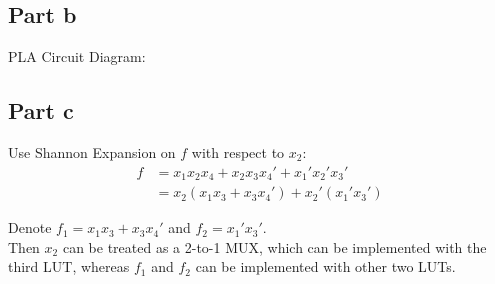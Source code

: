 \documentclass[12pt, a4paper]{article}
\begin{document}
	\subsection*{Part b}
	PLA Circuit Diagram:
	\begin{center}
	\end{center}
	
	\subsection*{Part c}
	Use Shannon Expansion on $f$ with respect to $x_2$:
	\begin{align*}
		f &= x_1x_2x_4 + x_2x_3x_4' + x_1'x_2'x_3' \\
		&= x_2(x_1x_3 + x_3x_4') + x_2'(x_1'x_3')
	\end{align*}
	
	Denote $f_1 = x_1x_3 + x_3x_4'$ and $f_2 = x_1'x_3'$. \\
	
	Then $x_2$ can be treated as a 2-to-1 MUX, which can be implemented
	with the third LUT, whereas $f_1$ and $f_2$ can be implemented with
	other two LUTs.
	
\end{document}

